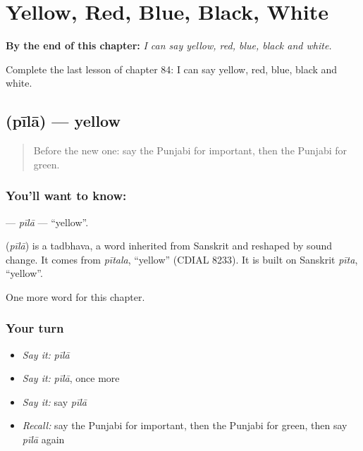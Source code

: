 
\chapter{Yellow, Red, Blue, Black, White}
\label{ch:pa-yellow-red-blue-black-white}

\begin{chapteropening}
\textbf{By the end of this chapter:} \emph{I can say yellow, red, blue, black and white.}

Complete the last lesson of chapter 84: I can say yellow, red, blue, black and white.
\end{chapteropening}

\section[\texorpdfstring{\pa{ਪੀਲਾ} (pīlā)}{ਪੀਲਾ (pīlā)}]{ (pīlā) — yellow}

\label{lesson:PA-C84-pila}



\begin{quote}
Before the new one: say the Punjabi for important, then the Punjabi for green.
\end{quote}

\subsection*{You'll want to know: }
\textbf{} — \emph{pīlā} — \textquotedblleft{}yellow\textquotedblright{}.

\begin{cousinweb}
\textbf{} (\emph{pīlā}) is a tadbhava, a word inherited from Sanskrit and reshaped by sound change. It comes from \emph{pītala}, \textquotedblleft{}yellow\textquotedblright{} (CDIAL 8233). It is built on Sanskrit \emph{pīta}, \textquotedblleft{}yellow\textquotedblright{}.
\end{cousinweb}

\begin{grammarlens}[title={What you've built}]
One more word for this chapter.
\end{grammarlens}

\subsection*{Your turn}
\begin{itemize}
\raggedright
  \item \emph{Say it:} \emph{pīlā}
  \item \emph{Say it:} \emph{pīlā}, once more
  \item \emph{Say it:} say \emph{pīlā}
  \item \emph{Recall:} say the Punjabi for important, then the Punjabi for green, then say \emph{pīlā} again
\end{itemize}

